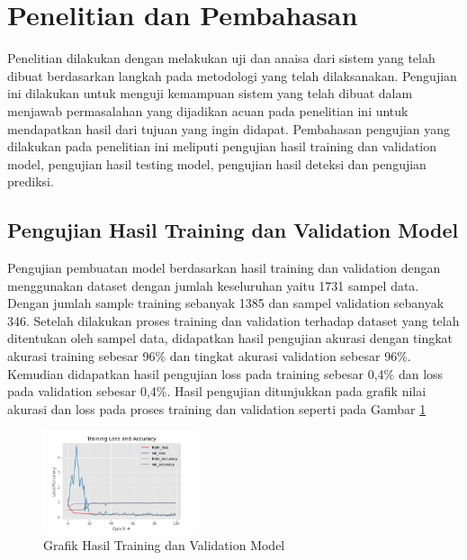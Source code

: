 \section{Penelitian dan Pembahasan}
\label{sec:PenelitianPembahasan}

Penelitian dilakukan dengan melakukan uji dan anaisa dari sistem yang telah dibuat berdasarkan langkah pada metodologi yang telah dilaksanakan. Pengujian ini dilakukan untuk menguji kemampuan sistem yang telah dibuat dalam menjawab permasalahan yang dijadikan acuan pada penelitian ini untuk mendapatkan hasil dari tujuan yang ingin didapat. Pembahasan pengujian yang dilakukan pada penelitian ini meliputi pengujian hasil training dan validation model, pengujian hasil testing model, pengujian hasil deteksi dan pengujian prediksi.

\subsection{Pengujian Hasil Training dan Validation Model}
\label{subsec:PengujianTrainingValidation}

Pengujian pembuatan model berdasarkan hasil training dan validation dengan menggunakan dataset dengan jumlah keseluruhan yaitu 1731 sampel data. Dengan jumlah sample training sebanyak 1385 dan sampel validation sebanyak 346. Setelah dilakukan proses training dan validation terhadap dataset yang telah ditentukan oleh sampel data, didapatkan hasil pengujian akurasi dengan tingkat akurasi training sebesar 96\% dan tingkat akurasi validation sebesar 96\%. Kemudian didapatkan hasil pengujian loss pada training sebesar 0,4\% dan loss pada validation sebesar 0,4\%. Hasil pengujian ditunjukkan pada grafik nilai akurasi dan loss pada proses training dan validation seperti pada Gambar \ref{fig:GrafikTrainingValidation}

\begin{figure} [ht]
  \centering
  \includegraphics[width=0.4\textwidth]{gambar/hasil training dan validation.png}
  \caption{Grafik Hasil Training dan Validation Model}
  \label{fig:GrafikTrainingValidation}
\end{figure}

